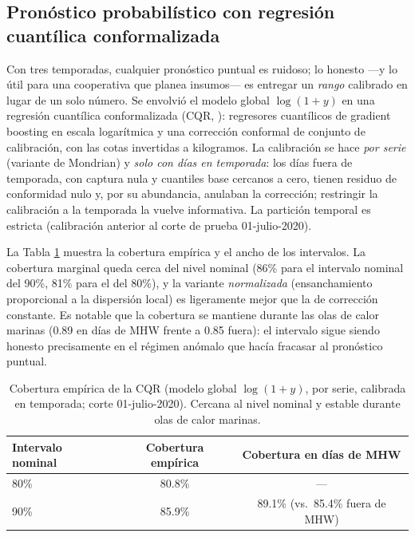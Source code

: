 \subsection{Pronóstico probabilístico con regresión cuantílica conformalizada}
Con tres temporadas, cualquier pronóstico puntual es ruidoso; lo honesto ---y lo útil para una cooperativa que planea insumos--- es entregar un \emph{rango} calibrado en lugar de un solo número. Se envolvió el modelo global $\log(1+y)$ en una regresión cuantílica conformalizada (CQR, \citealp{romano2019}): regresores cuantílicos de gradient boosting en escala logarítmica y una corrección conformal de conjunto de calibración, con las cotas invertidas a kilogramos. La calibración se hace \emph{por serie} (variante de Mondrian) y \emph{solo con días en temporada}: los días fuera de temporada, con captura nula y cuantiles base cercanos a cero, tienen residuo de conformidad nulo y, por su abundancia, anulaban la corrección; restringir la calibración a la temporada la vuelve informativa. La partición temporal es estricta (calibración anterior al corte de prueba 01-julio-2020).

La Tabla \ref{tab:extension_cqr} muestra la cobertura empírica y el ancho de los intervalos. La cobertura marginal queda cerca del nivel nominal (86\% para el intervalo nominal del 90\%, 81\% para el del 80\%), y la variante \emph{normalizada} (ensanchamiento proporcional a la dispersión local) es ligeramente mejor que la de corrección constante. Es notable que la cobertura se mantiene durante las olas de calor marinas (0.89 en días de MHW frente a 0.85 fuera): el intervalo sigue siendo honesto precisamente en el régimen anómalo que hacía fracasar al pronóstico puntual.

\begin{table}[htbp]
\centering
\begin{tabular}{lcc}
\toprule
Intervalo nominal & Cobertura empírica & Cobertura en días de MHW \\
\midrule
80\% & 80.8\% & --- \\
90\% & 85.9\% & 89.1\% (vs.\ 85.4\% fuera de MHW) \\
\bottomrule
\end{tabular}
\caption{Cobertura empírica de la CQR (modelo global $\log(1+y)$, por serie, calibrada en temporada; corte 01-julio-2020). Cercana al nivel nominal y estable durante olas de calor marinas.}
\label{tab:extension_cqr}
\end{table}

